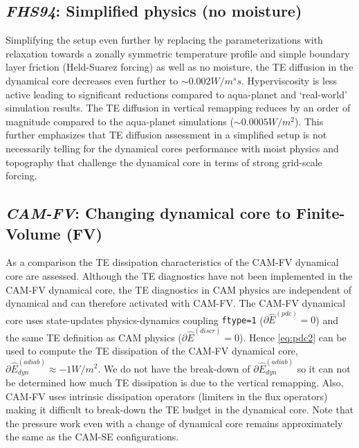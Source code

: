 \documentclass{agujournal}
\newcommand*{\gi}[1]{\widehat{#1}}
\begin{document}
\subsection{{\em{FHS94}}: Simplified physics (no moisture)}\label{sec:FHS94}
Simplifying the setup even further by replacing the parameterizations with relaxation towards a zonally symmetric temperature profile and simple boundary layer friction (Held-Suarez forcing) as well as no moisture, the TE diffusion in the dynamical core decreases even further to $\sim 0.002W/m^ss$. Hyperviscosity is less active leading to significant reductions compared to aqua-planet and `real-world' simulation results. The TE diffusion in vertical remapping reduces by an order of magnitude compared to the aqua-planet simulations ($\sim 0.0005W/m^2$). This further emphasizes that TE diffusion assessment in a simplified setup is not necessarily telling for the dynamical cores performance with moist physics and topography that challenge the dynamical core in terms of strong grid-scale forcing.
\subsection{{\em{CAM-FV}}: Changing dynamical core to Finite-Volume (FV)}\label{sec:cam-fv}
As a comparison the TE dissipation characteristics of the CAM-FV dynamical core are assessed. Although the TE diagnostics have not been implemented in the CAM-FV dynamical core, the TE diagnostics in CAM physics are independent of dynamical and can therefore activated with CAM-FV. The CAM-FV dynamical core uses state-updates physics-dynamics coupling {\tt{ftype=1}} ($\partial \gi{E}^{(pdc)}=0$) and the same TE definition as CAM physics ($\partial \gi{E}^{(discr)}=0$). Hence \eqref{eq:pdc2} can be used to compute the TE dissipation of the CAM-FV dynamical core, $\partial \gi{E}^{(adiab)}_{dyn}\approx -1 W/m^2$. We do not have the break-down of $\partial \gi{E}^{(adiab)}_{dyn}$ so it can not be determined how much TE dissipation is due to the vertical remapping. Also, CAM-FV uses intrinsic dissipation operators (limiters in the flux operators) making it difficult to break-down the TE budget in the dynamical core. Note that the pressure work even with a change of dynamical core remains approximately the same as the CAM-SE configurations.
\end{document}
